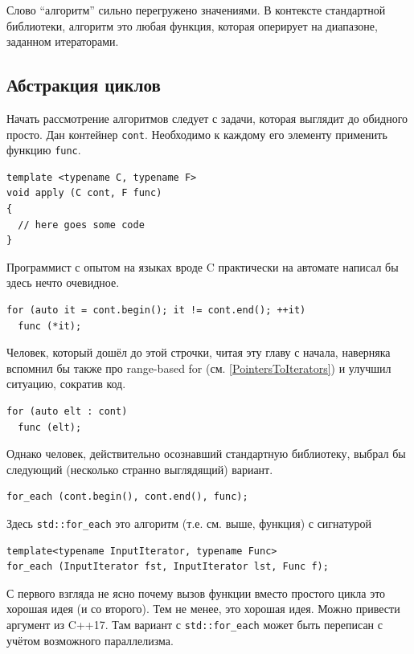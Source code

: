 \documentclass[a4paper,12pt,oneside]{book}
\begin{document}
Слово ``алгоритм'' сильно перегружено значениями. В контексте стандартной библиотеки, алгоритм это любая функция, которая оперирует на диапазоне, заданном итераторами.

\subsection{Абстракция циклов}

Начать рассмотрение алгоритмов следует с задачи, которая выглядит до обидного просто. Дан контейнер \lstinline!cont!. Необходимо к каждому его элементу применить функцию \lstinline!func!. 

\begin{lstlisting}
template <typename C, typename F> 
void apply (C cont, F func) 
{
  // here goes some code
}
\end{lstlisting}

Программист с опытом на языках вроде C практически на автомате написал бы здесь нечто очевидное.

\begin{lstlisting}
for (auto it = cont.begin(); it != cont.end(); ++it)
  func (*it);
\end{lstlisting}

Человек, который дошёл до этой строчки, читая эту главу с начала, наверняка вспомнил бы также про range-based for (см. \ref{PointersToIterators}) и улучшил ситуацию, сократив код.

\begin{lstlisting}
for (auto elt : cont)
  func (elt);
\end{lstlisting}

Однако человек, действительно осознавший стандартную библиотеку, выбрал бы следующий (несколько странно выглядящий) вариант.

\begin{lstlisting}
for_each (cont.begin(), cont.end(), func);
\end{lstlisting}

Здесь \lstinline!std::for_each! это алгоритм (т.е. см. выше, функция) с сигнатурой

\begin{lstlisting}
template<typename InputIterator, typename Func>
for_each (InputIterator fst, InputIterator lst, Func f);
\end{lstlisting}

С первого взгляда не ясно почему вызов функции вместо простого цикла это хорошая идея (и со второго). Тем не менее, это хорошая идея. Можно привести аргумент из C++17. Там вариант с \lstinline!std::for_each! может быть переписан с учётом возможного параллелизма.
\end{document}

